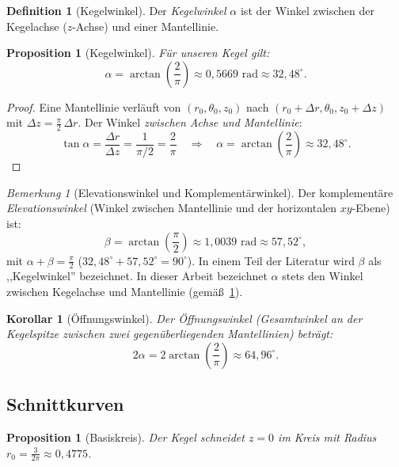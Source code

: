 \documentclass[12pt,a4paper]{article}
\theoremstyle{plain}
\newtheorem{proposition}[satz]{Proposition}
\newtheorem{korollar}[satz]{Korollar}
\theoremstyle{definition}
\newtheorem{definition}{Definition}[section]
\theoremstyle{remark}
\newtheorem{bemerkung}{Bemerkung}[section]
\begin{document}
\begin{definition}[Kegelwinkel]\label{def:kegelwinkel}
Der \emph{Kegelwinkel} $\alpha$ ist der Winkel zwischen der Kegelachse ($z$-Achse)
und einer Mantellinie.
\end{definition}

\begin{proposition}[Kegelwinkel]\label{prop:kegelwinkel}
F\"{u}r unseren Kegel gilt:
\begin{equation}\label{eq:kegelwinkel}
\alpha = \arctan\!\left(\frac{2}{\pi}\right) \approx 0{,}5669\text{ rad} \approx 32{,}48^\circ.
\end{equation}
\end{proposition}

\begin{proof}
Eine Mantellinie verl\"{a}uft von $(r_0,\theta_0,z_0)$ nach $(r_0+\Delta r,\theta_0,z_0+\Delta z)$
mit $\Delta z = \tfrac{\pi}{2}\,\Delta r$. Der Winkel \emph{zwischen Achse und Mantellinie}:
\[
\tan\alpha = \frac{\Delta r}{\Delta z} = \frac{1}{\pi/2} = \frac{2}{\pi}
\quad\Rightarrow\quad
\alpha = \arctan\!\left(\frac{2}{\pi}\right) \approx 32{,}48^\circ.
\]
\end{proof}

\begin{bemerkung}[Elevationswinkel und Komplement\"{a}rwinkel]\label{bem:winkel}
Der komplement\"{a}re \emph{Elevationswinkel} (Winkel zwischen Mantellinie und der
horizontalen $xy$-Ebene) ist:
\[
\beta = \arctan\!\left(\frac{\pi}{2}\right) \approx 1{,}0039\text{ rad} \approx 57{,}52^\circ,
\]
mit $\alpha+\beta = \tfrac{\pi}{2}$ ($32{,}48^\circ+57{,}52^\circ = 90^\circ$).
In einem Teil der Literatur wird $\beta$ als ,,Kegelwinkel'' bezeichnet.
In dieser Arbeit bezeichnet $\alpha$ stets den Winkel zwischen Kegelachse und
Mantellinie (gem\"{a}\ss\ \cref{def:kegelwinkel}).
\end{bemerkung}

\begin{korollar}[\"{O}ffnungswinkel]\label{kor:oeffnung}
Der \"{O}ffnungswinkel (Gesamtwinkel an der Kegelspitze zwischen zwei gegen\"{u}berliegenden
Mantellinien) betr\"{a}gt:
\[
2\alpha = 2\arctan\!\left(\frac{2}{\pi}\right) \approx 64{,}96^\circ.
\]
\end{korollar}

\subsection{Schnittkurven}

\begin{proposition}[Basiskreis]\label{prop:basiskreis}
Der Kegel schneidet $z=0$ im Kreis mit Radius
$r_0 = \tfrac{3}{2\pi} \approx 0{,}4775$.
\end{proposition}
\end{document}
